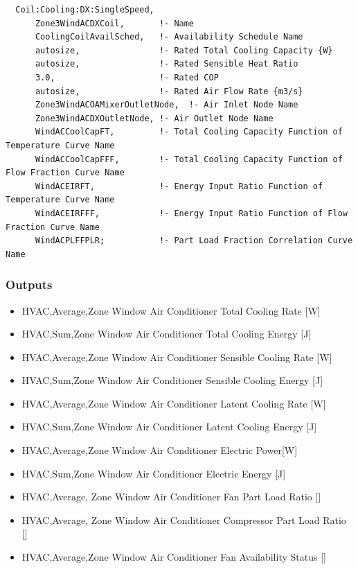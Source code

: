 \begin{lstlisting}
  Coil:Cooling:DX:SingleSpeed,
      Zone3WindACDXCoil,       !- Name
      CoolingCoilAvailSched,   !- Availability Schedule Name
      autosize,                !- Rated Total Cooling Capacity {W}
      autosize,                !- Rated Sensible Heat Ratio
      3.0,                     !- Rated COP
      autosize,                !- Rated Air Flow Rate {m3/s}
      Zone3WindACOAMixerOutletNode,  !- Air Inlet Node Name
      Zone3WindACDXOutletNode, !- Air Outlet Node Name
      WindACCoolCapFT,         !- Total Cooling Capacity Function of Temperature Curve Name
      WindACCoolCapFFF,        !- Total Cooling Capacity Function of Flow Fraction Curve Name
      WindACEIRFT,             !- Energy Input Ratio Function of Temperature Curve Name
      WindACEIRFFF,            !- Energy Input Ratio Function of Flow Fraction Curve Name
      WindACPLFFPLR;           !- Part Load Fraction Correlation Curve Name
\end{lstlisting}

\subsubsection{Outputs}\label{outputs-6-012}

\begin{itemize}
\item
  HVAC,Average,Zone Window Air Conditioner Total Cooling Rate {[}W{]}
\item
  HVAC,Sum,Zone Window Air Conditioner Total Cooling Energy {[}J{]}
\item
  HVAC,Average,Zone Window Air Conditioner Sensible Cooling Rate {[}W{]}
\item
  HVAC,Sum,Zone Window Air Conditioner Sensible Cooling Energy {[}J{]}
\item
  HVAC,Average,Zone Window Air Conditioner Latent Cooling Rate {[}W{]}
\item
  HVAC,Sum,Zone Window Air Conditioner Latent Cooling Energy {[}J{]}
\item
  HVAC,Average,Zone Window Air Conditioner Electric Power{[}W{]}
\item
  HVAC,Sum,Zone Window Air Conditioner Electric Energy {[}J{]}
\item
  HVAC,Average, Zone Window Air Conditioner Fan Part Load Ratio {[]}
\item
  HVAC,Average, Zone Window Air Conditioner Compressor Part Load Ratio {[]}
\item
  HVAC,Average,Zone Window Air Conditioner Fan Availability Status {[]}
\end{itemize}

